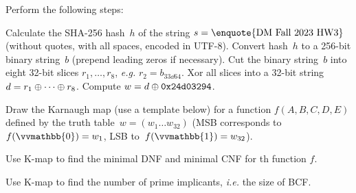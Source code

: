 \documentclass[a4paper,12pt]{article}
\begin{document}

\begin{tasks}
    \item Perform the following steps:
    \begin{subtasks}
        \item Calculate the SHA-256 hash~$h$ of the string $s = \text{\enquote{DM Fall 2023 HW3}}$ (without quotes, with all spaces, encoded in UTF-8).
        Convert hash~$h$ to a 256-bit binary string~$b$ (prepend leading zeros if necessary).
        Cut the binary string~$b$ into eight 32-bit slices $r_1, \dotsc, r_8$, \textit{e.g.} $r_2 = b_{33 \dd 64}$.
        Xor all slices into a 32-bit string $d = r_1 \oplus \dotsb \oplus r_8$.
        Compute $w = d \oplus \mathtt{0x24d03294}$.

        \item Draw the Karnaugh map (use a template below) for a function $f(A,B,C,D,E)$ defined by the truth table~$w = (w_{1} \dots w_{32})$ (MSB corresponds to~$f(\vvmathbb{0}) = w_{1}$, LSB to~$f(\vvmathbb{1}) = w_{32}$).

        \item Use K-map to find the minimal DNF and minimal CNF for th function $f$.

        \item Use K-map to find the number of prime implicants, \textit{i.e.} the size of BCF\@.

\end{subtasks}
\end{tasks}
\end{document}
